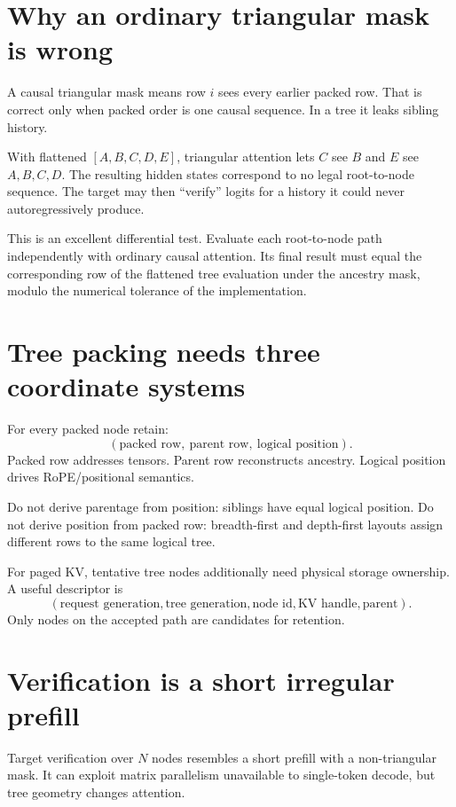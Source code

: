 \section{Why an ordinary triangular mask is wrong}

A causal triangular mask means row $i$ sees every earlier packed row. That is correct
only when packed order is one causal sequence. In a tree it leaks sibling history.

With flattened $[A,B,C,D,E]$, triangular attention lets $C$ see $B$ and $E$ see
$A,B,C,D$. The resulting hidden states correspond to no legal root-to-node sequence.
The target may then ``verify'' logits for a history it could never autoregressively
produce.

This is an excellent differential test. Evaluate each root-to-node path independently
with ordinary causal attention. Its final result must equal the corresponding row of
the flattened tree evaluation under the ancestry mask, modulo the numerical tolerance
of the implementation.

\section{Tree packing needs three coordinate systems}

For every packed node retain:
\[
(\text{packed row},\ \text{parent row},\ \text{logical position}).
\]
Packed row addresses tensors. Parent row reconstructs ancestry. Logical position drives
RoPE/positional semantics.

Do not derive parentage from position: siblings have equal logical position. Do not
derive position from packed row: breadth-first and depth-first layouts assign different
rows to the same logical tree.

For paged KV, tentative tree nodes additionally need physical storage ownership. A
useful descriptor is
\[
(\text{request generation},\text{tree generation},\text{node id},
\text{KV handle},\text{parent}).
\]
Only nodes on the accepted path are candidates for retention.

\section{Verification is a short irregular prefill}

Target verification over $N$ nodes resembles a short prefill with a non-triangular
mask. It can exploit matrix parallelism unavailable to single-token decode, but tree
geometry changes attention.

